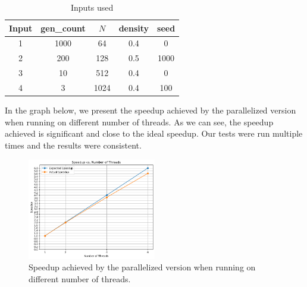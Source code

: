 \documentclass{article}
\begin{document}
\begin{table}[h!]
	\centering
	\begin{tabular}{||c c c c c||} 
	 \hline
	 Input & gen\_count & $N$ & density & seed  \\ [0.5ex] 
	 \hline\hline
	 1 & 1000 & 64 & 0.4 & 0 \\ 
	 2 & 200 & 128 & 0.5 & 1000 \\
	 3 & 10 & 512 & 0.4 & 0 \\ 
	 4 & 3 & 1024 & 0.4 & 100 \\ [1ex] 
	 \hline
	\end{tabular}
	\caption{Inputs used}
	\label{table:2}
\end{table}

In the graph below, we present the speedup achieved by the parallelized version 
when running on different number of threads. As we can see, the speedup achieved 
is significant and close to the ideal speedup. Our tests were run multiple times 
and the results were consistent.

\begin{figure}[htbp]
    \centering
    \includegraphics[width=0.5\textwidth]{img/speedup-threads.png}
    \caption{Speedup achieved by the parallelized version when running on different number of threads.}
    \label{fig:name}
\end{figure}

\newpage



% 

\end{document}
